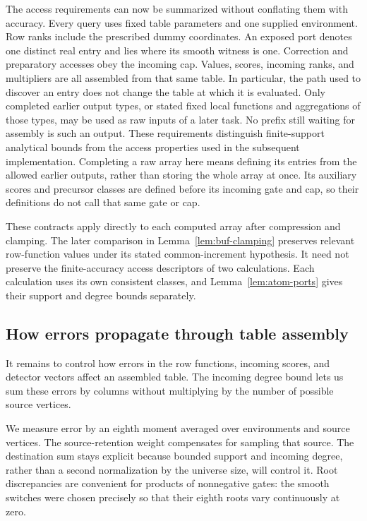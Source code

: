 The access requirements can now be summarized without conflating them with accuracy. Every query uses fixed table parameters and one supplied environment. Row ranks include the prescribed dummy coordinates. An exposed port denotes one distinct real entry and lies where its smooth witness is one. Correction and preparatory accesses obey the incoming cap. Values, scores, incoming ranks, and multipliers are all assembled from that same table. In particular, the path used to discover an entry does not change the table at which it is evaluated.  Only completed earlier output types, or stated fixed local
functions and aggregations of those types, may be used as raw inputs of
a later task.  No prefix still waiting for assembly is such an output.
These requirements distinguish finite-support analytical bounds from
the access properties used in the subsequent implementation.
Completing a raw array here means defining its entries from the allowed
earlier outputs, rather than storing the whole array at once.  Its
auxiliary scores and precursor classes are defined before its incoming
gate and cap, so their definitions do not call that same gate or cap.

These contracts apply directly to each computed array after compression
and clamping.  The later comparison in Lemma~\ref{lem:buf-clamping}
preserves relevant row-function values under its stated common-increment
hypothesis.  It need not preserve the finite-accuracy access descriptors
of two calculations.  Each calculation uses its own consistent classes,
and Lemma~\ref{lem:atom-ports} gives their support and degree bounds
separately.

\subsection{How errors propagate through table assembly}

It remains to control how errors in the row functions, incoming scores,
and detector vectors affect an assembled table.  The incoming degree
bound lets us sum these errors by columns without multiplying by the
number of possible source vertices.

We measure error by an eighth moment averaged over environments and source vertices. The source-retention weight compensates for sampling that source. The destination sum stays explicit because bounded support and incoming degree, rather than a second normalization by the universe size, will control it. Root discrepancies are convenient for products of nonnegative gates: the smooth switches were chosen precisely so that their eighth roots vary continuously at zero.

